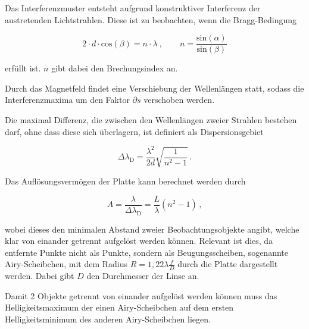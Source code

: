 \noindent
Das Interferenzmuster entsteht aufgrund konstruktiver Interferenz der austretenden Lichtstrahlen. Diese ist zu beobachten, wenn die Bragg-Bedingung 

\vspace{-5pt}
\begin{equation}
    2 \cdot d \cdot \text{cos}(\beta) = n \cdot \lambda \: , 
    \qquad n = \frac{\text{sin}(\alpha)}{\text{sin}(\beta)}
\end{equation}

\noindent
 erfüllt ist. $n$ gibt dabei den Brechungsindex an.

\noindent
Durch das Magnetfeld findet eine Verschiebung der Wellenlängen statt, sodass die Interferenzmaxima um den Faktor $\partial s$ verschoben werden.

\noindent
Die maximal Differenz, die zwischen den Wellenlängen zweier Strahlen bestehen darf, ohne dass diese sich überlagern, ist definiert als Dispersionsgebiet


\begin{equation}
    \Delta \lambda_\text{D} = \frac{\lambda^2}{2d} \sqrt{\frac{1}{n^2-1}}\, .
    \label{eqn:lam}
\end{equation}

\noindent
Das Auflösungsvermögen der Platte kann berechnet werden durch 

\vspace{-5pt}
\begin{equation}
    A = \frac{\lambda}{\Delta \lambda_\text{D}} = \frac{L}{\lambda} (n^2 -1) \, ,
    \label{eqn:a}
\end{equation}

\noindent
wobei dieses den minimalen Abstand zweier Beobachtungsobjekte angibt, welche klar von einander getrennt aufgelöst werden können. Relevant ist dies, da entfernte Punkte nicht als Punkte,
sondern als Beugungsscheiben, sogenannte Airy-Scheibchen, mit dem Radius $ R = 1,22 \lambda \frac{f}{D}$ durch die Platte dargestellt werden. Dabei gibt $D$ den Durchmesser der 
Linse an. 

\noindent
Damit 2 Objekte getrennt von einander aufgelöst werden können muss das Helligkeitsmaximum der einen Airy-Scheibchen auf dem ersten Helligkeitsminimum des anderen Airy-Scheibchen liegen.


